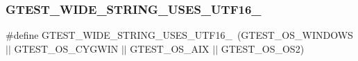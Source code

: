 \subsubsection{\texorpdfstring{GTEST\_WIDE\_STRING\_USES\_UTF16\_}{GTEST\_WIDE\_STRING\_USES\_UTF16\_}}
{\footnotesize\ttfamily \#define G\+T\+E\+S\+T\+\_\+\+W\+I\+D\+E\+\_\+\+S\+T\+R\+I\+N\+G\+\_\+\+U\+S\+E\+S\+\_\+\+U\+T\+F16\+\_\+~(G\+T\+E\+S\+T\+\_\+\+O\+S\+\_\+\+W\+I\+N\+D\+O\+WS $\vert$$\vert$ G\+T\+E\+S\+T\+\_\+\+O\+S\+\_\+\+C\+Y\+G\+W\+IN $\vert$$\vert$ G\+T\+E\+S\+T\+\_\+\+O\+S\+\_\+\+A\+IX $\vert$$\vert$ G\+T\+E\+S\+T\+\_\+\+O\+S\+\_\+\+O\+S2)}

